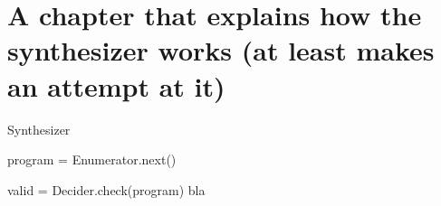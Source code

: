 \chapter{A chapter that explains how the synthesizer works (at least makes an attempt at it)}

\begin{algorithm}
\caption{Synthesizer}
\label{alg:synthesizer}
\begin{algorithmic}
\State program = Enumerator.next()

    \State valid = Decider.check(program)
        \State bla
    \EndIf
    
\EndWhile


\end{algorithmic}
\end{algorithm}

